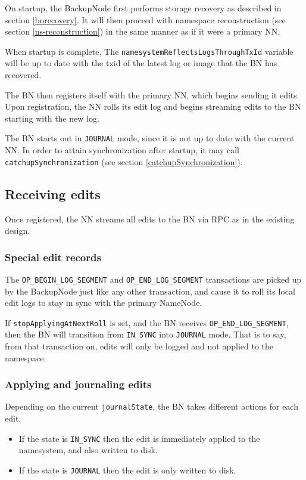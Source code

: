 \documentclass{article}
\begin{document}
On startup, the BackupNode first performs storage recovery as described in section \ref{bnrecovery}.
It will then proceed with namespace reconstruction (see section \ref{ns-reconstruction}) in the same manner as if it were a primary NN.

When startup is complete, The {\tt namesystemReflectsLogsThroughTxId} variable will be up to date with the txid of the latest log or image that the BN has recovered.

The BN then registers itself with the primary NN, which begins sending it edits. Upon registration, the NN rolls its edit log and begins streaming edits to the BN starting with the new log.

The BN starts out in {\tt JOURNAL} mode, since it is not up to date with the current NN. In order to attain synchronization after startup, it may call {\tt catchupSynchronization} (see section \ref{catchupSynchronization}).

\subsection{Receiving edits}

Once registered, the NN streams all edits to the BN via RPC as in the existing design.

\subsubsection{Special edit records}


The {\tt OP\_BEGIN\_LOG\_SEGMENT} and {\tt OP\_END\_LOG\_SEGMENT} transactions are picked up by the BackupNode just like any other
transaction, and cause it to roll its local edit logs to stay in sync with the primary NameNode.

If {\tt stopApplyingAtNextRoll} is set, and the BN receives {\tt OP\_END\_LOG\_SEGMENT}, then the BN will transition from {\tt IN\_SYNC} into
{\tt JOURNAL} mode. That is to say, from that transaction on, edits will only be logged and not applied to the namespace.

\subsubsection{Applying and journaling edits}

Depending on the current {\tt journalState}, the BN takes different actions for each edit.

\begin{itemize}
\item If the state is {\tt IN\_SYNC} then the edit is immediately applied to the namesystem, and also written to disk.
\item If the state is {\tt JOURNAL} then the edit is only written to disk.
\end{itemize}
\end{document}
